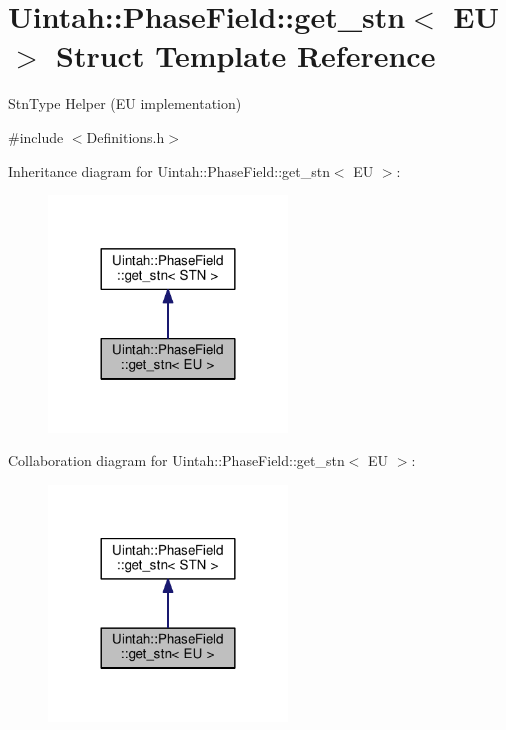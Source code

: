 \hypertarget{structUintah_1_1PhaseField_1_1get__stn_3_01EU_01_4}{}\section{Uintah\+:\+:Phase\+Field\+:\+:get\+\_\+stn$<$ EU $>$ Struct Template Reference}
\label{structUintah_1_1PhaseField_1_1get__stn_3_01EU_01_4}


Stn\+Type Helper (EU implementation)  




{\ttfamily \#include $<$Definitions.\+h$>$}



Inheritance diagram for Uintah\+:\+:Phase\+Field\+:\+:get\+\_\+stn$<$ EU $>$\+:\nopagebreak
\begin{figure}[H]
\begin{center}
\leavevmode
\includegraphics[width=180pt]{structUintah_1_1PhaseField_1_1get__stn_3_01EU_01_4__inherit__graph}
\end{center}
\end{figure}


Collaboration diagram for Uintah\+:\+:Phase\+Field\+:\+:get\+\_\+stn$<$ EU $>$\+:\nopagebreak
\begin{figure}[H]
\begin{center}
\leavevmode
\includegraphics[width=180pt]{structUintah_1_1PhaseField_1_1get__stn_3_01EU_01_4__coll__graph}
\end{center}
\end{figure}
